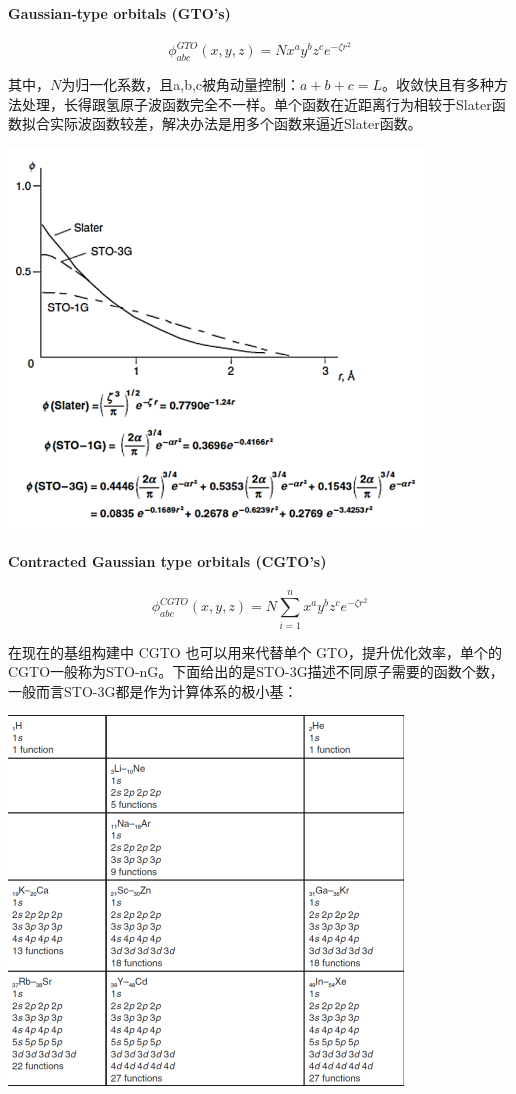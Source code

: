 \paragraph*{Gaussian-type orbitals (GTO's)}
\[\phi_{abc}^{GTO}(x,y,z)=Nx^ay^bz^ce^{-\zeta r^2}\]

其中，$N$为归一化系数，且a,b,c被角动量控制：$a+b+c=L$。收敛快且有多种方法处理，长得跟氢原子波函数完全不一样。单个函数在近距离行为相较于Slater函数拟合实际波函数较差，解决办法是用多个函数来逼近Slater函数。

\begin{center}
    \includegraphics{fig/lzhx/微信图片_20211102165150}
\end{center}

\paragraph*{Contracted Gaussian type orbitals (CGTO's)}
\[\phi_{abc}^{CGTO}(x,y,z)=N\sum_{i=1}^n x^ay^bz^ce^{-\zeta r^2}\]

在现在的基组构建中 CGTO 也可以用来代替单个 GTO，提升优化效率，单个的CGTO一般称为STO-nG。下面给出的是STO-3G描述不同原子需要的函数个数，一般而言STO-3G都是作为计算体系的极小基：
\begin{center}
    \includegraphics[scale=0.7]{fig/lzhx/微信图片_20211102171332.png}
\end{center}

